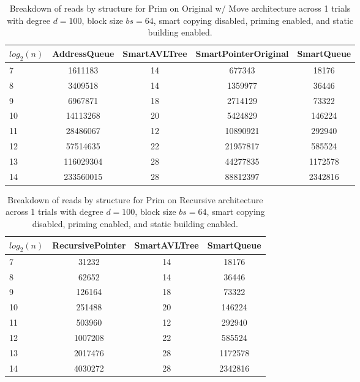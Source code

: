 \begin{table}[]
\centering
\begin{tabular}{|l|c|c|c|c|}
$log_2(n)$ & AddressQueue & SmartAVLTree & SmartPointerOriginal & SmartQueue \\ \hline
7 & 1611183 & 14 & 677343 & 18176 \\ \hline
8 & 3409518 & 14 & 1359977 & 36446 \\ \hline
9 & 6967871 & 18 & 2714129 & 73322 \\ \hline
10 & 14113268 & 20 & 5424829 & 146224 \\ \hline
11 & 28486067 & 12 & 10890921 & 292940 \\ \hline
12 & 57514635 & 22 & 21957817 & 585524 \\ \hline
13 & 116029304 & 28 & 44277835 & 1172578 \\ \hline
14 & 233560015 & 28 & 88812397 & 2342816 \\ \hline
\end{tabular}
\caption{Breakdown of reads by structure for Prim on Original w/ Move architecture across 1 trials with degree $d=100$, block size $bs=64$, smart copying disabled, priming enabled, and static building enabled.}
    \label{tab:reads_by_structure_prim_d100_bs64_trials1_copiesfalse_primetrue_staticinsertiontrue_ptoriginal_movetrue}
\end{table}

\begin{table}[]
\centering
\begin{tabular}{|l|c|c|c|}
$log_2(n)$ & RecursivePointer & SmartAVLTree & SmartQueue \\ \hline
7 & 31232 & 14 & 18176 \\ \hline
8 & 62652 & 14 & 36446 \\ \hline
9 & 126164 & 18 & 73322 \\ \hline
10 & 251488 & 20 & 146224 \\ \hline
11 & 503960 & 12 & 292940 \\ \hline
12 & 1007208 & 22 & 585524 \\ \hline
13 & 2017476 & 28 & 1172578 \\ \hline
14 & 4030272 & 28 & 2342816 \\ \hline
\end{tabular}
\caption{Breakdown of reads by structure for Prim on Recursive architecture across 1 trials with degree $d=100$, block size $bs=64$, smart copying disabled, priming enabled, and static building enabled.}
    \label{tab:reads_by_structure_prim_d100_bs64_trials1_copiesfalse_primetrue_staticinsertiontrue_ptrecursive_movetrue}
\end{table}

